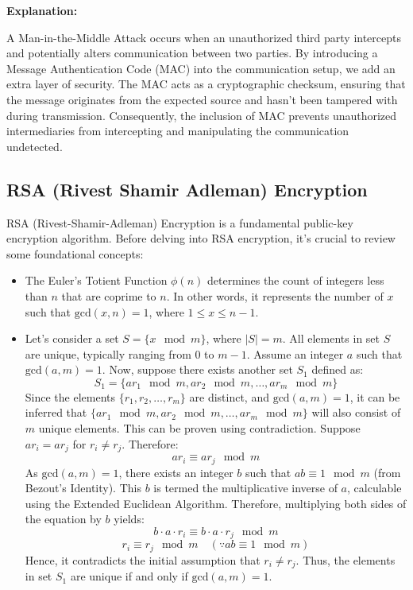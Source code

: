\documentclass[11pt]{article}
\begin{document}
\textbf{Explanation:}

A Man-in-the-Middle Attack occurs when an unauthorized third party intercepts and potentially alters communication between two parties. By introducing a Message Authentication Code (MAC) into the communication setup, we add an extra layer of security. The MAC acts as a cryptographic checksum, ensuring that the message originates from the expected source and hasn't been tampered with during transmission. Consequently, the inclusion of MAC prevents unauthorized intermediaries from intercepting and manipulating the communication undetected.


\subsection{RSA (Rivest Shamir Adleman) Encryption}
RSA (Rivest-Shamir-Adleman) Encryption is a fundamental public-key encryption algorithm. Before delving into RSA encryption, it's crucial to review some foundational concepts:

\begin{itemize}
  \item The Euler's Totient Function $\phi(n)$ determines the count of integers less than $n$ that are coprime to $n$. In other words, it represents the number of $x$ such that $\text{gcd}(x, n) = 1$, where $1 \leq x \leq n - 1$.
  
  \item Let's consider a set $S = \{x \mod m\}$, where $|S| = m$. All elements in set $S$ are unique, typically ranging from 0 to $m-1$. Assume an integer $a$ such that $\text{gcd}(a, m) = 1$. Now, suppose there exists another set $S_1$ defined as:
  \[ S_1 = \{ar_1 \mod m, ar_2 \mod m, \ldots, ar_m \mod m\} \]
  Since the elements $\{r_1, r_2, \ldots, r_m\}$ are distinct, and $\text{gcd}(a, m) = 1$, it can be inferred that $\{ar_1 \mod m, ar_2 \mod m, \ldots, ar_m \mod m\}$ will also consist of $m$ unique elements. This can be proven using contradiction. Suppose $ar_i = ar_j$ for $r_i \neq r_j$. Therefore:
  \[ ar_i \equiv ar_j \mod m \]
  As $\text{gcd}(a, m) = 1$, there exists an integer $b$ such that $ab \equiv 1 \mod m$ (from Bezout's Identity). This $b$ is termed the multiplicative inverse of $a$, calculable using the Extended Euclidean Algorithm. Therefore, multiplying both sides of the equation by $b$ yields:
  \[ b \cdot a \cdot r_i \equiv b \cdot a \cdot r_j \mod m \]
  \[ r_i \equiv r_j \mod m \quad (\because ab \equiv 1 \mod m) \]
  Hence, it contradicts the initial assumption that $r_i \neq r_j$. Thus, the elements in set $S_1$ are unique if and only if $\text{gcd}(a, m) = 1$.
\end{itemize}
\end{document}

